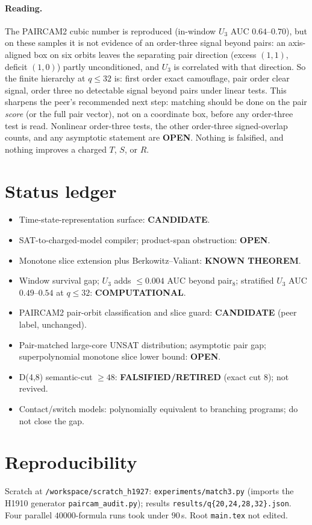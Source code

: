 \documentclass[11pt]{article}
\begin{document}
\paragraph{Reading.} The PAIRCAM2 cubic number is reproduced (in-window $U_3$ AUC $0.64$--$0.70$), but on these samples it is not evidence of an order-three signal beyond pairs: an axis-aligned box on six orbits leaves the separating pair direction (excess $(1,1)$, deficit $(1,0)$) partly unconditioned, and $U_3$ is correlated with that direction. So the finite hierarchy at $q\le32$ is: first order exact camouflage, pair order clear signal, order three no detectable signal beyond pairs under linear tests. This sharpens the peer's recommended next step: matching should be done on the pair \emph{score} (or the full pair vector), not on a coordinate box, before any order-three test is read. Nonlinear order-three tests, the other order-three signed-overlap counts, and any asymptotic statement are \textbf{OPEN}. Nothing is falsified, and nothing improves a charged $T$, $S$, or $R$.

\section*{Status ledger}
\begin{itemize}
\item Time-state-representation surface: \textbf{CANDIDATE}.
\item SAT-to-charged-model compiler; product-span obstruction: \textbf{OPEN}.
\item Monotone slice extension plus Berkowitz--Valiant: \textbf{KNOWN THEOREM}.
\item Window survival gap; $U_3$ adds $\le0.004$ AUC beyond pair$_8$; stratified $U_3$ AUC $0.49$--$0.54$ at $q\le32$: \textbf{COMPUTATIONAL}.
\item PAIRCAM2 pair-orbit classification and slice guard: \textbf{CANDIDATE} (peer label, unchanged).
\item Pair-matched large-core UNSAT distribution; asymptotic pair gap; superpolynomial monotone slice lower bound: \textbf{OPEN}.
\item D(4,8) semantic-cut $\ge48$: \textbf{FALSIFIED/RETIRED} (exact cut 8); not revived.
\item Contact/switch models: polynomially equivalent to branching programs; do not close the gap.
\end{itemize}

\section*{Reproducibility}
Scratch at \texttt{/workspace/scratch\_h1927}: \texttt{experiments/match3.py} (imports the H1910 generator \texttt{paircam\_audit.py}); results \texttt{results/q\{20,24,28,32\}.json}. Four parallel $40000$-formula runs took under $90$\,s. Root \texttt{main.tex} not edited.
\end{document}
